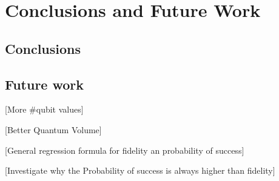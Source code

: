 

\chapter{Conclusions and Future Work}
\label{sec:orga673787}
\section{Conclusions}
\label{sec:orgfce9b07}
\section{Future work}
\label{sec:org424244c}

[More \#qubit values]

[Better Quantum Volume]

[General regression formula for fidelity an probability of success]

[Investigate why the Probability of success is always higher than fidelity]
